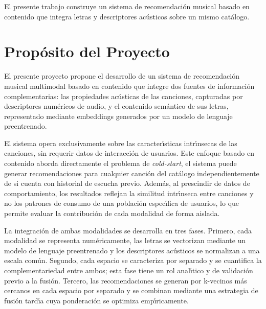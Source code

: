 El presente trabajo construye un sistema de recomendaci\'{o}n musical basado en contenido que integra letras y descriptores ac\'{u}sticos sobre un mismo cat\'{a}logo.

\section{Prop\'{o}sito del Proyecto}
\label{sec:proposito}

El presente proyecto propone el desarrollo de un sistema de recomendaci\'{o}n musical multimodal basado en contenido que integre dos fuentes de informaci\'{o}n complementarias: las propiedades ac\'{u}sticas de las canciones, capturadas por descriptores num\'{e}ricos de audio, y el contenido sem\'{a}ntico de sus letras, representado mediante embeddings generados por un modelo de lenguaje preentrenado.

El sistema opera exclusivamente sobre las caracter\'{\i}sticas intr\'{\i}nsecas de las canciones, sin requerir datos de interacci\'{o}n de usuarios. Este enfoque basado en contenido aborda directamente el problema de \textit{cold-start}, el sistema puede generar recomendaciones para cualquier canci\'{o}n del cat\'{a}logo independientemente de si cuenta con historial de escucha previo. Adem\'{a}s, al prescindir de datos de comportamiento, los resultados reflejan la similitud intr\'{\i}nseca entre canciones y no los patrones de consumo de una poblaci\'{o}n espec\'{\i}fica de usuarios, lo que permite evaluar la contribuci\'{o}n de cada modalidad de forma aislada.

La integraci\'{o}n de ambas modalidades se desarrolla en tres fases. Primero, cada modalidad se representa num\'{e}ricamente, las letras se vectorizan mediante un modelo de lenguaje preentrenado y los descriptores ac\'{u}sticos se normalizan a una escala com\'{u}n. Segundo, cada espacio se caracteriza por separado y se cuantifica la complementariedad entre ambos; esta fase tiene un rol anal\'{\i}tico y de validaci\'{o}n previo a la fusi\'{o}n. Tercero, las recomendaciones se generan por k-vecinos m\'{a}s cercanos en cada espacio por separado y se combinan mediante una estrategia de fusi\'{o}n tard\'{\i}a cuya ponderaci\'{o}n se optimiza emp\'{\i}ricamente.

